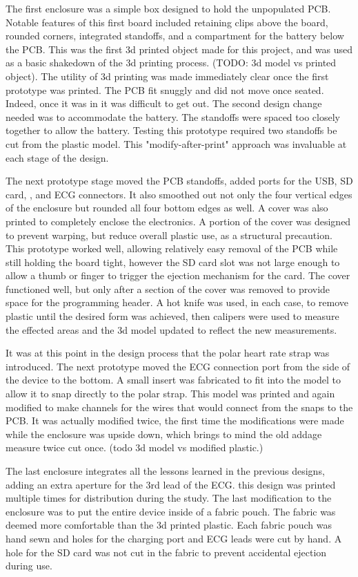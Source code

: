 The first enclosure was a simple box designed to hold the unpopulated PCB. Notable features of this first board included retaining clips above the board, rounded corners, integrated standoffs, and a compartment for the battery below the PCB. This was the first 3d printed object made for this project, and was used as a basic shakedown of the 3d printing process. (TODO: 3d model vs printed object). The utility of 3d printing was made immediately clear once the first prototype was printed. The PCB fit snuggly and did not move once seated. Indeed, once it was in it was difficult to get out. The second design change needed was to accommodate the battery. The standoffs were spaced too closely together to allow the battery. Testing this prototype  required two standoffs be cut from the plastic model. This "modify-after-print" approach was invaluable at each stage of the design.

The next prototype stage moved the PCB standoffs, added ports for the USB, SD card, , and ECG connectors. It also smoothed out not only the four vertical edges of the enclosure but rounded all four bottom edges as well. A cover was also printed to completely enclose the electronics. A portion of the cover was designed to prevent warping, but reduce overall plastic use, as a structural precaution. This prototype worked well, allowing relatively easy removal of the PCB while still holding the board tight, however the SD card slot was not large enough to allow a thumb or finger to trigger the ejection mechanism for the card. The cover functioned well, but only after a section of the cover was removed to provide space for the programming header.  A hot knife was used, in each case, to remove plastic until the desired form was achieved, then calipers were used to measure the effected areas and the 3d model updated to reflect the new measurements.

It was at this point in the design process that the polar heart rate strap was introduced. The next prototype moved the ECG connection port from the side of the device to the bottom. A small insert was fabricated to fit into the model to allow it to snap directly to the polar strap. This model was printed and again modified to make channels for the wires that would connect from the snaps to the PCB. It was actually modified twice, the first time the modifications were made while the enclosure was upside down, which brings to mind the old addage measure twice cut once. (todo 3d model vs modified plastic.)

The last enclosure integrates all the lessons learned in the previous designs, adding an extra aperture for the 3rd lead of the ECG. this design was printed multiple times for distribution during the study. The last modification to the enclosure was to put the entire device inside of a fabric pouch. The fabric was deemed more comfortable than the 3d printed plastic. Each fabric pouch was hand sewn and holes for the charging port and ECG leads were cut by hand. A hole for the SD card was not cut in the fabric to prevent accidental ejection during use.

